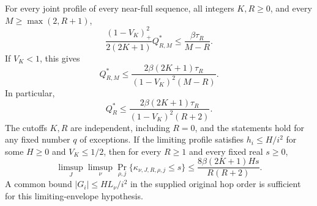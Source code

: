 \begin{theorem}\label{thm:necessary-cover}
For every joint profile of every near-full sequence, all integers
$K,R\ge0$, and every $M\ge\max(2,R+1)$,
\begin{equation}\label{eq:weighted-necessary-cover}
 \frac{(1-V_K)_+^2}{2(2K+1)}Q_{R,M}^*
 \le\frac{\beta\tau_R}{M-R}.
\end{equation}
If $V_K<1$, this gives
\[
 Q_{R,M}^*\le
 \frac{2\beta(2K+1)\tau_R}{(1-V_K)^2(M-R)}.
\]
In particular,
\begin{equation}\label{eq:necessary-cover}
 Q_R^*\le
 \frac{2\beta(2K+1)\tau_R}{(1-V_K)^2(R+2)}.
\end{equation}
The cutoffs $K,R$ are independent, including $R=0$, and the statements
hold for any fixed number $q$ of exceptions.
If the limiting profile satisfies $h_i\le H/i^2$ for some $H\ge0$ and
$V_K\le1/2$, then for every $R\ge1$ and every fixed real $s\ge0$,
\begin{equation}\label{eq:cover-saturation}
 \limsup_J\limsup_\nu
 \Pr_{\rho,j}\{\kappa_{\nu,J,R,\rho,j}\le s\}
 \le \frac{8\beta(2K+1)Hs}{R(R+2)}.
\end{equation}
A common bound $|G_i|\le HL_\nu/i^2$ in the supplied original hop order
is sufficient for this limiting-envelope hypothesis.
\end{theorem}
